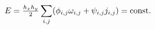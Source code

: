 \documentclass[preview]{standalone}
\begin{document}
\begin{align*}
\special{dvisvgm:raw <g id='unique000'>}E=\tfrac{h_xh_y}{2}\sum_{i,j}(\phi_{i,j}\omega_{i,j}+\psi_{i,j}j_{i,j}) = \text{const.}\special{dvisvgm:raw </g>}
\end{align*}
\end{document}
